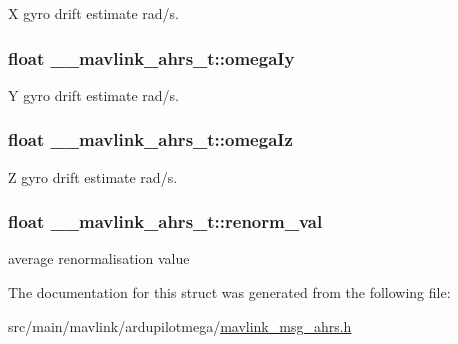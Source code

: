X gyro drift estimate rad/s. 

\hypertarget{struct____mavlink__ahrs__t_a0c47a70ed78c739cb99581bc01a292b9}{
\subsubsection[{omega\+Iy}]{\setlength{\rightskip}{0pt plus 5cm}float \+\_\+\+\_\+mavlink\+\_\+ahrs\+\_\+t\+::omega\+Iy}}\label{struct____mavlink__ahrs__t_a0c47a70ed78c739cb99581bc01a292b9}


Y gyro drift estimate rad/s. 

\hypertarget{struct____mavlink__ahrs__t_a5c67391e53eff953940817d638739ed3}{
\subsubsection[{omega\+Iz}]{\setlength{\rightskip}{0pt plus 5cm}float \+\_\+\+\_\+mavlink\+\_\+ahrs\+\_\+t\+::omega\+Iz}}\label{struct____mavlink__ahrs__t_a5c67391e53eff953940817d638739ed3}


Z gyro drift estimate rad/s. 

\hypertarget{struct____mavlink__ahrs__t_a59e54e67dd062055d7553cf4a76cbb2b}{
\subsubsection[{renorm\+\_\+val}]{\setlength{\rightskip}{0pt plus 5cm}float \+\_\+\+\_\+mavlink\+\_\+ahrs\+\_\+t\+::renorm\+\_\+val}}\label{struct____mavlink__ahrs__t_a59e54e67dd062055d7553cf4a76cbb2b}


average renormalisation value 



The documentation for this struct was generated from the following file\+:\begin{DoxyCompactItemize}
\item 
src/main/mavlink/ardupilotmega/\hyperlink{mavlink__msg__ahrs_8h}{mavlink\+\_\+msg\+\_\+ahrs.\+h}\end{DoxyCompactItemize}
